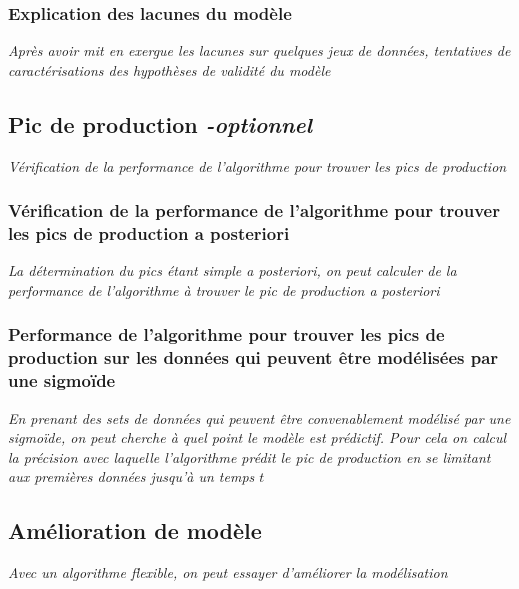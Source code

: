 \documentclass{article}
\begin{document}
\subsubsection{Explication des lacunes du modèle}
\textit{Après avoir mit en exergue les lacunes sur quelques jeux de données, tentatives de caractérisations des hypothèses de validité du modèle}

\subsection{Pic de production \textit{-optionnel}}
\textit{Vérification de la performance de l'algorithme pour trouver les pics de production}

\subsubsection{Vérification de la performance de l'algorithme pour trouver les pics de production a posteriori}
\textit{La détermination du pics étant simple a posteriori, on peut calculer de la performance de l'algorithme à trouver le pic de production a posteriori}

\subsubsection{Performance de l'algorithme pour trouver les pics de production sur les données qui peuvent être modélisées par une sigmoïde}
\textit{En prenant des sets de données qui peuvent être convenablement modélisé par une sigmoïde, on peut cherche à quel point le modèle est prédictif. Pour cela on calcul la précision avec laquelle l'algorithme prédit le pic de production en se limitant aux premières données jusqu'à un temps $t$}

\subsection{Amélioration de modèle}
\textit{Avec un algorithme flexible, on peut essayer d'améliorer la modélisation}
\end{document}
